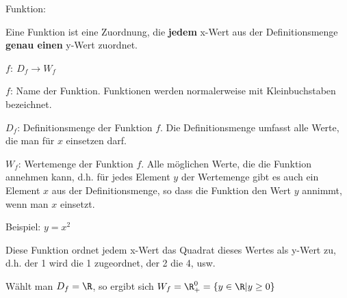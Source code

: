 \begin{tcolorbox}
    Funktion:

    \bigskip

    \textcolor{loestc}{Eine Funktion ist eine Zuordnung, die \textbf{jedem} x-Wert aus der Definitionsmenge \textbf{genau einen} y-Wert zuordnet.
    }

    \bigskip

    \textcolor{loestc}{\(f:\ D_f\rightarrow W_f\)}
\end{tcolorbox}
\(f\): \textcolor{loes}{Name der Funktion. Funktionen werden normalerweise mit Kleinbuchstaben bezeichnet.}

\medskip

\(D_f\): \textcolor{loes}{Definitionsmenge der Funktion \(f\). Die Definitionsmenge umfasst alle Werte, die man für \(x\) einsetzen darf.}

\medskip

\(W_f\): \textcolor{loes}{Wertemenge der Funktion \(f\). Alle möglichen Werte, die die Funktion annehmen kann, d.h. für jedes Element \(y\) der Wertemenge gibt es auch ein Element \(x\) aus der Definitionsmenge, so dass die Funktion den Wert \(y\) annimmt, wenn man \(x\) einsetzt.}

Beispiel: \(y=x^2\)

\textcolor{loes}{Diese Funktion ordnet jedem x-Wert das Quadrat dieses Wertes als y-Wert zu, d.h. der 1 wird die 1 zugeordnet, der 2 die 4, usw.}

\textcolor{loes}{Wählt man \(D_f=\R\), so ergibt sich \(W_f=\R^0_+=\{y\in\R\vert y\geq 0\}\)}

\bigskip

